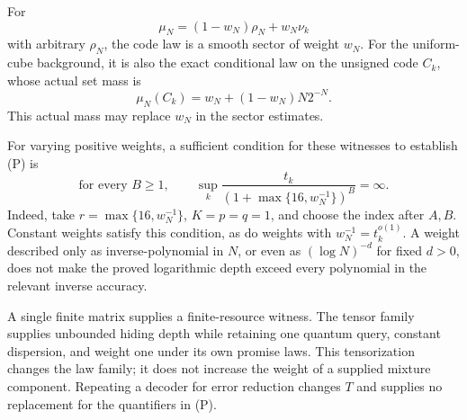 \begin{remark}
\label{ian:hadamard-mixtures-amplification}
For
\[
 \mu_N=(1-w_N)\rho_N+w_N\nu_k
\]
with arbitrary \(\rho_N\), the code law is a smooth sector of weight \(w_N\).
For the uniform-cube background, it is also the exact conditional law on the unsigned code \(C_k\), whose actual set mass is
\[
 \mu_N(C_k)=w_N+(1-w_N)N2^{-N}.
\]
This actual mass may replace \(w_N\) in the sector estimates.

For varying positive weights, a sufficient condition for these witnesses to establish (P) is
\[
 \text{for every }B\ge1,\qquad
 \sup_k
 \frac{t_k}{(1+\max\{16,w_N^{-1}\})^B}
 =\infty.
\]
Indeed, take \(r=\max\{16,w_N^{-1}\}\), \(K=p=q=1\), and choose the index after \(A,B\).
Constant weights satisfy this condition, as do weights with
\(w_N^{-1}=t_k^{o(1)}\).
A weight described only as inverse-polynomial in \(N\), or even as
\((\log N)^{-d}\) for fixed \(d>0\), does not make the proved logarithmic depth exceed every polynomial in the relevant inverse accuracy.

A single finite matrix supplies a finite-resource witness. The tensor family supplies unbounded hiding depth while retaining one quantum query, constant dispersion, and weight one under its own promise laws. This tensorization changes the law family; it does not increase the weight of a supplied mixture component. Repeating a decoder for error reduction changes \(T\) and supplies no replacement for the quantifiers in (P).
\end{remark}
